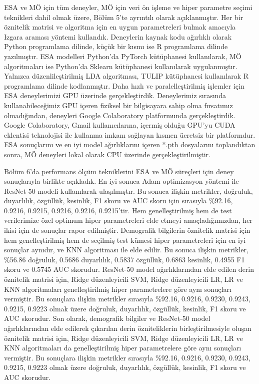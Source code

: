 ESA ve MÖ için tüm deneyler, MÖ için veri ön işleme ve hiper parametre seçimi teknikleri dahil olmak üzere, Bölüm 5'te ayrıntılı olarak açıklanmıştır. Her bir öznitelik matrisi ve algoritma için en uygun parametreleri bulmak amacıyla Izgara araması yöntemi kullandık. Deneylerin kaynak kodu ağırlıklı olarak Python programlama dilinde, küçük bir kısmı ise R programlama dilinde yazılmıştır. ESA modelleri Python'da PyTorch kütüphanesi kullanılarak, MÖ algoritmaları ise Python'da Sklearn kütüphanesi kullanılarak uygulanmıştır. Yalnızca düzenlileştirilmiş LDA algoritması, TULIP kütüphanesi kullanılarak R programlama dilinde kodlanmıştır. Daha hızlı ve paralelleştirilmiş işlemler için ESA deneylerimizi GPU üzerinde gerçekleştirdik. Deneylerimiz sırasında kullanabileceğimiz GPU içeren fiziksel bir bilgisayara sahip olma fırsatımız olmadığından, deneyleri Google Colaboratory platformunda gerçekleştirdik. Google Colaboratory, Gmail kullanıcılarına, içermiş olduğu GPU'yu CUDA eklentisi teknolojisi ile kullanma imkanı sağlayan kısmen ücretsiz bir platformdur. ESA sonuçlarını ve en iyi model ağırlıklarını içeren *.pth dosyalarını toplandıktan sonra, MÖ deneyleri lokal olarak CPU üzerinde gerçekleştirilmiştir.

Bölüm 6'da performans ölçüm tekniklerini ESA ve MÖ süreçleri için deney sonuçlarıyla birlikte açıkladık. En iyi sonuca Adam optimizasyon yöntemi ile ResNet-50 modeli kullanılarak ulaşılmıştır. Bu sonuca ilişkin metrikler, doğruluk, duyarlılık, özgüllük, kesinlik, F1 skoru ve AUC skoru için sırasıyla \%92.16, 0.9216, 0.9215, 0.9216, 0.9216, 0.9215'tir. Hem genelleştirilmiş hem de test verilerimize özel optimum hiper parametreleri elde etmeyi amaçladığımızdan, her ikisi için de sonuçlar rapor edilmiştir. Demografik bilgilerin öznitelik matrisi için hem genelleştirilmiş hem de seçilmiş test kümesi hiper parametreleri için en iyi sonuçlar aynıdır, ve KNN algoritması ile elde edilir. Bu sonuca ilişkin metrikler, \%56.86 doğruluk, 0.5686 duyarlılık, 0.5837 özgüllük, 0.6863 kesinlik, 0.4955 F1 skoru ve 0.5745 AUC skorudur. ResNet-50 model ağırlıklarından elde edilen derin öznitelik matrisi için, Ridge düzenleyicili SVM, Ridge düzenleyicili LR, LR ve KNN algoritmaları genelleştirilmiş hiper parametrelere göre aynı sonuçları vermiştir. Bu sonuçlara ilişkin metrikler sırasıyla \%92.16, 0.9216, 0.9230, 0.9243, 0.9215, 0.9223 olmak üzere doğruluk, duyarlılık, özgüllük, kesinlik, F1 skoru ve AUC skorudur. Son olarak, demografik bilgiler ve ResNet-50 model ağırlıklarından elde edilerek çıkarılan derin özniteliklerin birleştirilmesiyle oluşan öznitelik matrisi için, Ridge düzenleyicili SVM, Ridge düzenleyicili LR, LR ve KNN algoritmaları da genelleştirilmiş hiper parametrelere göre aynı sonuçları vermiştir. Bu sonuçlara ilişkin metrikler sırasıyla \%92.16, 0.9216, 0.9230, 0.9243, 0.9215, 0.9223 olmak üzere doğruluk, duyarlılık, özgüllük, kesinlik, F1 skoru ve AUC skorudur.

